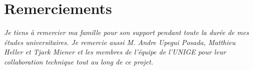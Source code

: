 \chapter*{Remerciements} %

\textit{Je tiens à remercier ma famille pour son support pendant toute la durée de mes études universitaires.
Je remercie aussi M. Andre Upegui Posada, Matthieu Heller et Tjark Miener et les membres de l'équipe de l'UNIGE pour leur collaboration technique tout au long de ce projet.}